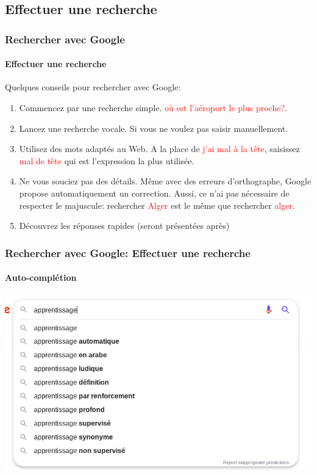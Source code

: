\documentclass{beamer}
\begin{document}
\subsection{Effectuer une recherche}

\begin{frame}
\frametitle{Rechercher avec Google}
\framesubtitle{Effectuer une recherche}

Quelques conseils pour rechercher avec Google: 
\begin{enumerate}
	\item Commencez par une recherche simple. \textcolor{red}{où est l'aéroport le plus proche?}.
	
	\item Lancez une recherche vocale. Si vous ne voulez pas saisir manuellement.
	
	\item Utilisez des mots adaptés au Web. A la place de \textcolor{red}{j'ai mal à la tête}, saisissez \textcolor{red}{mal de tête} qui est l'expression la plus utilisée.
	
	\item Ne vous souciez pas des détails. Même avec des erreurs d'orthographe, Google propose automatiquement un correction. Aussi, ce n'ai pas nécessaire de respecter le majuscule: rechercher \textcolor{red}{Alger} est le même que rechercher \textcolor{red}{alger}.
	
	\item Découvrez les réponses rapides (seront présentées après)
\end{enumerate}

\end{frame}

\begin{frame}
\frametitle{Rechercher avec Google: Effectuer une recherche}
\framesubtitle{Auto-complétion}

\begin{center}
	\includegraphics[height=.87\textheight]{..//img/Bweb02-ri-gmail/google-autocomplete.png}
\end{center}

\end{frame}
\end{document}
